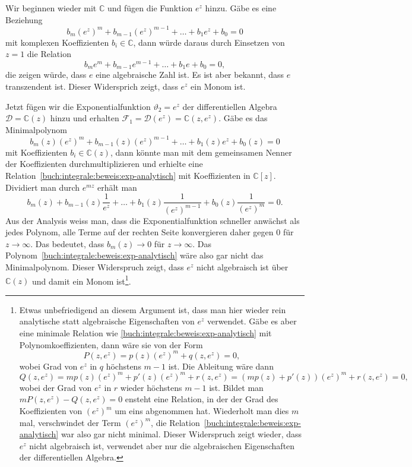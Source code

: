 \begin{beispiel}
Wir beginnen wieder mit $\mathbb{C}$ und fügen die Funktion
$e^z$ hinzu.
Gäbe es eine Beziehung
\[
b_m(e^z)^m + b_{m-1}(e^z)^{m-1}+\dots+b_1e^z + b_0=0
\]
mit komplexen Koeffizienten $b_i\in\mathbb{C}$,
dann würde daraus durch Einsetzen von $z=1$ die Relation
\[
b_me^m + b_{m-1}e^{m-1} + \dots + b_1e + b_0=0,
\]
die zeigen würde, dass $e$ eine algebraische Zahl ist.
Es ist aber bekannt, dass $e$ transzendent ist.
Dieser Widersprich zeigt, dass $e^z$ ein Monom ist.
\end{beispiel}

\begin{beispiel}
Jetzt fügen wir die Exponentialfunktion $\vartheta_2=e^z$
der differentiellen Algebra $\mathscr{D}=\mathbb{C}(z)$ hinzu
und erhalten $\mathscr{F}_1=\mathscr{D}(e^z) = \mathbb{C}(z,e^z)$.
Gäbe es das Minimalpolynom 
\begin{equation}
b_m(z)(e^z)^m + b_{m-1}(z)(e^z)^{m-1}+\dots+b_1(z)e^z + b_0(z)=0
\label{buch:integrale:beweis:exp-analytisch}
\end{equation}
mit Koeffizienten $b_i\in\mathbb{C}(z)$, dann könnte man mit dem
gemeinsamen Nenner der Koeffizienten durchmultiplizieren und erhielte
eine Relation~\eqref{buch:integrale:beweis:exp-analytisch} mit
Koeffizienten in $\mathbb{C}[z]$.
Dividiert man durch $e^{mz}$ erhält man
\[
b_m(z) + b_{m-1}(z)\frac{1}{e^z} + \dots + b_1(z)\frac{1}{(e^z)^{m-1}} + b_0(z)\frac{1}{(e^z)^m}=0.
\]
Aus der Analysis weiss man, dass die Exponentialfunktion schneller
anwächst als jedes Polynom, alle Terme auf der rechten Seite
konvergieren daher gegen 0 für $z\to\infty$.
Das bedeutet, dass $b_m(z)\to0$ für $z\to \infty$.
Das Polynom~\eqref{buch:integrale:beweis:exp-analytisch} wäre also gar
nicht das Minimalpolynom.
Dieser Widerspruch zeigt, dass $e^z$ nicht algebraisch ist über
$\mathbb{C}(z)$ und damit ein Monom ist\footnote{Etwas unbefriedigend
an diesem Argument ist, dass man hier wieder rein analytische statt
algebraische Eigenschaften von $e^z$ verwendet.
Gäbe es aber eine minimale Relation wie
\eqref{buch:integrale:beweis:exp-analytisch}
mit Polynomkoeffizienten, dann wäre sie von der Form
\[
P(z,e^z)=p(z)(e^z)^m + q(z,e^z)=0,
\]
wobei Grad von $e^z$ in $q$ höchstens $m-1$ ist.
Die Ableitung wäre dann
\[
Q(z,e^z)
=
mp(z)(e^z)^m + p'(z)(e^z)^m + r(z,e^z)
=
(mp(z) + p'(z))(e^z)^m + r(z,e^z)
=0,
\]
wobei der Grad von $e^z$ in $r$ wieder höchstens $m-1$ ist.
Bildet man $mP(z,e^z) - Q(z,e^z) = 0$ ensteht eine Relation,
in der der Grad des Koeffizienten von $(e^z)^m$ um eins abgenommen hat.
Wiederholt man dies $m$ mal, verschwindet der Term $(e^z)^m$, die
Relation~\eqref{buch:integrale:beweis:exp-analytisch}
war also gar nicht minimal.
Dieser Widerspruch zeigt wieder, dass $e^z$ nicht algebraisch ist,
verwendet aber nur die algebraischen Eigenschaften der differentiellen
Algebra.
}.
\end{beispiel}

